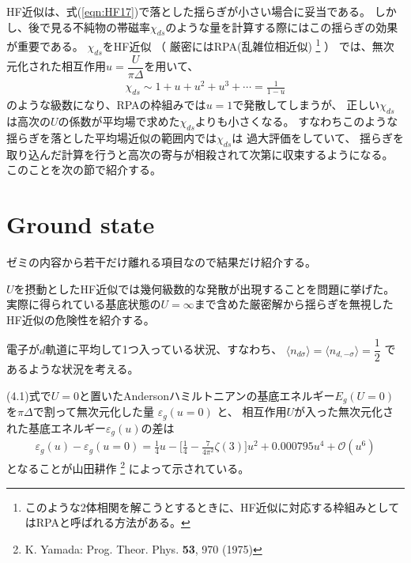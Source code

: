 \documentclass[a4j]{jarticle}
\begin{document}
HF近似は、式(\ref{eqn:HF17})で落とした揺らぎが小さい場合に妥当である。
しかし、後で見る不純物の帯磁率$\chi_{ds}$のような量を計算する際にはこの揺らぎの効果が重要である。
$\chi_{ds}$をHF近似
（
厳密にはRPA(乱雑位相近似)
\footnote{
	このような2体相関を解こうとするときに、HF近似に対応する枠組みとしてはRPAと呼ばれる方法がある。
}
）
では、無次元化された相互作用$u=\dfrac{U}{\pi \Delta}$を用いて、
\begin{align}
	\chi_{ds}
	\sim
	1
	+
	u
	+
	u^{2}
	+
	u^{3}
	+
	\cdots
	=
	\frac{1}{1-u}
\end{align}
のような級数になり、RPAの枠組みでは$u=1$で発散してしまうが、
正しい$\chi_{ds}$は高次の$U$の係数が平均場で求めた$\chi_{ds}$よりも小さくなる。
すなわちこのような揺らぎを落とした平均場近似の範囲内では$\chi_{ds}$は
過大評価をしていて、
揺らぎを取り込んだ計算を行うと高次の寄与が相殺されて次第に収束するようになる。
このことを次の節で紹介する。

\section*{Ground state}

ゼミの内容から若干だけ離れる項目なので結果だけ紹介する。

$U$を摂動としたHF近似では幾何級数的な発散が出現することを問題に挙げた。
実際に得られている基底状態の$U = \infty$まで含めた厳密解から揺らぎを無視したHF近似の危険性を紹介する。

電子が$d$軌道に平均して1つ入っている状況、すなわち、
$
	\langle n_{d \sigma} \rangle
	=
	\langle n_{d, -\sigma} \rangle
	=
	\dfrac{1}{2}
$
であるような状況を考える。

(4.1)式で$U=0$と置いたAndersonハミルトニアンの基底エネルギー$E_{g}(U=0)$を$\pi \Delta$で割って無次元化した量
$\varepsilon_{g}(u=0)$
と、
相互作用$U$が入った無次元化された基底エネルギー$\varepsilon_{g}(u)$の差は
\begin{align}
	\varepsilon_{g}(u)-
	\varepsilon_{g}(u=0)
	=
	\frac{1}{4}
	u
	-
	\bigg[
		\frac{1}{4}
		-
		\frac{7}{4 \pi^{2}}
		\zeta(3)
		\bigg]
	u^{2}
	+
	0.000795u^{4}
	+
	\mathcal{O}(u^{6})
	\label{eqn:yamadakousaku}
\end{align}
となることが山田耕作
\footnote{
	K. Yamada: Prog. Theor. Phys. {\bf 53}, 970 (1975)
}
によって示されている。
\end{document}
